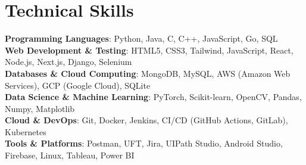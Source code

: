 \documentclass[letterpaper,10pt]{article}
\begin{document}
\section{Technical Skills}
 \begin{itemize}[leftmargin=0.15in, label={}, itemsep=-5pt, topsep=-2pt, parsep=0pt]
    \small{\item{
     \textbf{Programming Languages}{: Python, Java, C, C++, JavaScript, Go, SQL} \\
     \textbf{Web Development \& Testing}{: HTML5, CSS3, Tailwind, JavaScript, React, Node.js, Next.js, Django, Selenium} \\
     \textbf{Databases \& Cloud Computing}{: MongoDB, MySQL, AWS (Amazon Web Services), GCP (Google Cloud), SQLite} \\
     \textbf{Data Science \& Machine Learning}{: PyTorch, Scikit-learn, OpenCV, Pandas, Numpy, Matplotlib} \\
     \textbf{Cloud \& DevOps}{: Git, Docker, Jenkins, CI/CD (GitHub Actions, GitLab), Kubernetes} \\
     \textbf{Tools \& Platforms}{: Postman, UFT, Jira, UIPath Studio, Android Studio, Firebase, Linux, Tableau, Power BI}
    }}
 \end{itemize}
\vspace{-12pt}
\end{document}
